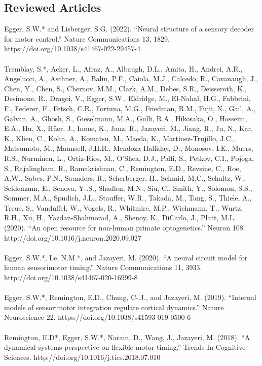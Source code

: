 \documentclass[a4paper,9pt]{extarticle}
\begin{document}
    \subsection*{Reviewed Articles}
    Egger, S.W.* and Lisberger, S.G. (2022). “Neural structure of a sensory decoder for motor control.” Nature Communications 13, 1829. https://doi.org/10.1038/s41467-022-29457-4 \\
    \\
    Tremblay, S.*, Acker, L., Afraz, A., Albaugh, D.L., Amita, H., Andrei, A.R., Angelucci, A., Aschner, A., Balin, P.F., Caiola, M.J., Calcedo, R., Cavanaugh, J., Chen, Y., Chen, S., Chernov, M.M., Clark, A.M., Debes, S.R., Deisseroth, K., Desimone, R., Dragoi, V., Egger, S.W., Eldridge, M., El-Nahal, H.G., Fabbrini, F., Federer, F., Fetsch, C.R., Fortuna, M.G., Friedman, R.M., Fujii, N., Gail, A., Galvan, A., Ghosh, S., Gieselmann, M.A., Gulli, R.A., Hikosaka, O., Hosseini, E.A., Hu, X., Hüer, J., Inoue, K., Janz, R., Jazayeri, M., Jiang, R., Ju, N., Kar, K., Klien, C., Kohn, A., Komatsu, M., Maeda, K., Martinez-Trujillo, J.C., Matsumoto, M., Maunsell, J.H.R., Mendoza-Halliday, D., Monosov, I.E., Muers, R.S., Nurminen, L., Ortiz-Rios, M., O’Shea, D.J., Palfi, S., Petkov, C.I., Pojoga, S., Rajalingham, R., Ramakrishnan, C., Remington, E.D., Revsine, C., Roe, A.W., Sabes, P.N., Saunders, R., Scherberger, H., Schmid, M.C., Schultz, W., Seidemann, E., Senova, Y-.S., Shadlen, M.N., Siu, C., Smith, Y., Solomon, S.S., Sommer, M.A., Spudich, J.L., Stauffer, W.R., Takada, M., Tang, S., Thiele, A., Treue, S., Vanduffel, W., Vogels, R., Whitmire, M.P., Wichmann, T., Wurtz, R.H., Xu, H., Yazdan-Shahmorad, A., Shenoy, K., DiCarlo, J., Platt, M.L. (2020). “An open resource for non-human primate optogenetics.”  Neuron 108. http://doi.org/10.1016/j.neuron.2020.09.027 \\
    \\
    Egger, S.W.*, Le, N.M.*, and Jazayeri, M. (2020). “A neural circuit model for human sensorimotor timing.” Nature Communications 11, 3933. http://doi.org/10.1038/s41467-020-16999-8 \\
    \\
    Egger, S.W.*, Remington, E.D., Chung, C-.J., and Jazayeri, M. (2019). “Internal models of sensorimotor integration regulate cortical dynamics.” Nature Neuroscience 22. https://doi.org/10.1038/s41593-019-0500-6 \\
    \\
    Remington, E.D*, Egger, S.W.*, Narain, D., Wang, J., Jazayeri, M. (2018). “A dynamical systems perspective on flexible motor timing.” Trends In Cognitive Sciences. http://doi.org/10.1016/j.tics.2018.07.010 \\
\end{document}
